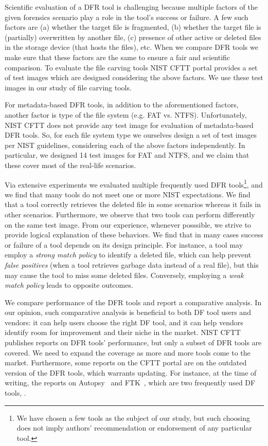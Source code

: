 Scientific evaluation of a DFR tool is challenging because multiple factors of the given forensics scenario play a role in the tool's success or failure.
A few such factors are (a) whether the target file is fragmented, (b) whether the target file is (partially) overwritten by another file, 
(c) presence of other active or deleted files in the storage device (that hosts the files), etc.
When we compare DFR tools we make sure that these factors are the same to ensure a fair and scientific comparison.
To evaluate the file carving tools NIST CFTT portal provides a set of test images which are designed considering the above factors.
We use these test images in our study of file carving tools. 

For metadata-based DFR tools, in addition to the aforementioned factors, another factor is type of the file system (e.g. FAT vs. NTFS). 
Unfortunately, NIST CFTT does not provide any test image for evaluation of metadata-based DFR tools.
So, for each file system type we ourselves design a set of test images per NIST guidelines, considering each of the above factors independently.
In particular, we designed 14 test images for FAT and NTFS, and we claim that these cover most of the real-life scenarios.


Via extensive experiments we evaluated multiple frequently used DFR tools\footnote{We have chosen a few tools as the subject of our study, 
but such choosing does not imply authors' recommendation or endorsement of any particular tool.}, and we find that many tools do not meet one or more NIST expectations.
We find that a tool correctly retrieves the deleted file in some scenarios whereas it fails in other scenarios. Furthermore, we observe that 
two tools can perform differently on the same test image. From our experience, whenever posssible, 
we strive to provide logical explanation of these behaviors. We find that in many cases 
success or failure of a tool depends on its design principle. 
For instance, a tool may employ a \emph{strong match policy} to identify a deleted file, which can help prevent \emph{false positives} (when a tool retrieves garbage data instead of a real file),
but this may cause the tool to miss some deleted files. Conversely, employing a \emph{weak match policy} leads to opposite outcomes. 
 
We compare performance of the DFR tools and report a comparative analysis. In our opinion, such comparative analysis is beneficial to both DF tool 
users and vendors: it can help users choose the right DF tool, and it can help vendors identify room for improvement and their niche in the market. 
NIST CFTT publishes reports on DFR tools' performance, but only a subset of DFR tools are covered. 
We need to expand the coverage as more and more tools come to the market.
Furthermore, some reports on the CFTT portal are on the outdated version of the DFR tools, which warrants updating. 
For instance, at the time of writing, the reports on Autopsy~\cite{dhs:autopsy} and FTK~\cite{dhs:ftk}, which are two frequently used DF tools, 
.   

